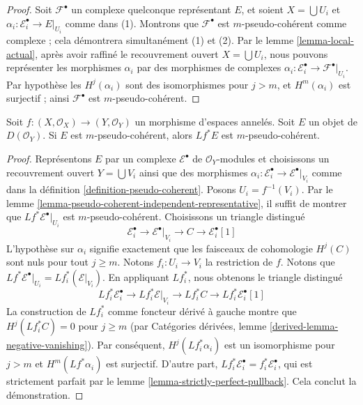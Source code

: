 {\begin{lemma}
\begin{enumerate}
\end{enumerate}

\end{lemma}

\begin{proof}

Soit $\mathcal{F}^\bullet$ un complexe quelconque représentant $E$,
et soient $X = \bigcup U_i$ et
$\alpha_i : \mathcal{E}_i^\bullet \to E|_{U_i}$ comme dans (1). Montrons que $\mathcal{F}^\bullet$ est $m$-pseudo-cohérent comme complexe ; cela démontrera simultanément (1) et (2). Par le lemme \ref{lemma-local-actual},
après avoir raffiné le recouvrement ouvert $X = \bigcup U_i$, nous pouvons
représenter les morphismes $\alpha_i$ par des morphismes de complexes
$\alpha_i : \mathcal{E}_i^\bullet \to \mathcal{F}^\bullet|_{U_i}$. Par hypothèse
les $H^j(\alpha_i)$ sont des isomorphismes pour $j > m$, et $H^m(\alpha_i)$
est surjectif ; ainsi $\mathcal{F}^\bullet$ est
$m$-pseudo-cohérent.

\end{proof}

\begin{lemma}

\label{lemma-pseudo-coherent-pullback}
Soit $f : (X, \mathcal{O}_X) \to (Y, \mathcal{O}_Y)$ un morphisme d'espaces annelés. Soit $E$ un objet de $D(\mathcal{O}_Y)$. Si $E$ est $m$-pseudo-cohérent, alors $Lf^*E$ est $m$-pseudo-cohérent.
\end{lemma}

\begin{proof}

Représentons $E$ par un complexe $\mathcal{E}^\bullet$ de $\mathcal{O}_Y$-modules et choisissons un recouvrement ouvert $Y = \bigcup V_i$ ainsi que des morphismes
$\alpha_i : \mathcal{E}_i^\bullet \to \mathcal{E}^\bullet|_{V_i}$
comme dans la définition \ref{definition-pseudo-coherent}. Posons $U_i = f^{-1}(V_i)$. Par le lemme \ref{lemma-pseudo-coherent-independent-representative},
il suffit de montrer que $Lf^*\mathcal{E}^\bullet|_{U_i}$ est
$m$-pseudo-cohérent. Choisissons un triangle distingué
$$
\mathcal{E}_i^\bullet \to
\mathcal{E}^\bullet|_{V_i} \to
C \to
\mathcal{E}_i^\bullet[1]
$$
L'hypothèse sur $\alpha_i$ signifie exactement que les faisceaux de cohomologie
$H^j(C)$ sont nuls pour tout $j \geq m$. Notons $f_i : U_i \to V_i$
la restriction de $f$. Notons que $Lf^*\mathcal{E}^\bullet|_{U_i} = 
Lf_i^*(\mathcal{E}|_{V_i})$. En appliquant $Lf_i^*$, nous obtenons le triangle distingué
$$
Lf_i^*\mathcal{E}_i^\bullet \to
Lf_i^*\mathcal{E}|_{V_i} \to
Lf_i^*C \to
Lf_i^*\mathcal{E}_i^\bullet[1]
$$
La construction de $Lf_i^*$ comme foncteur dérivé à gauche montre que
$H^j(Lf_i^*C) = 0$ pour $j \geq m$ (par Catégories dérivées, lemme
\ref{derived-lemma-negative-vanishing}). Par conséquent, $H^j(Lf_i^*\alpha_i)$ est un isomorphisme pour $j > m$ et $H^m(Lf^*\alpha_i)$ est surjectif.
D'autre part, $Lf_i^*\mathcal{E}_i^\bullet = f_i^*\mathcal{E}_i^\bullet$, qui est strictement parfait par le lemme \ref{lemma-strictly-perfect-pullback}. Cela conclut la démonstration.


\end{proof}}
